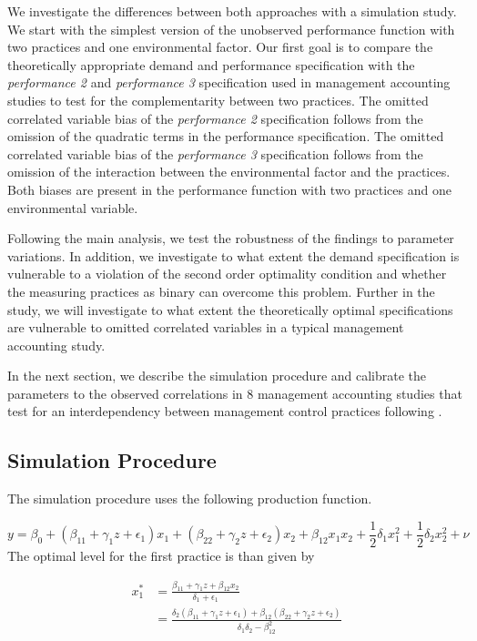 \documentclass[12pt]{article}
\begin{document}
We investigate the differences between both approaches with a simulation study. We start with the simplest version of the unobserved performance function with two practices and one environmental factor. Our first goal is to compare the theoretically appropriate demand and performance specification with the \emph{performance 2} and \emph{performance 3} specification used in management accounting studies to test for the complementarity between two practices. The omitted correlated variable bias of  the \emph{performance 2} specification follows from the omission of the quadratic terms in the performance specification. The omitted correlated variable bias of the \emph{performance 3} specification follows from the omission of the interaction between the environmental factor and the practices. Both biases are present in the performance function with two practices and one environmental variable. 

Following the main analysis, we test the robustness of the findings to parameter variations. In addition, we investigate to what extent the demand specification is vulnerable to a violation of the second order optimality condition and whether the measuring practices as binary can overcome this problem. Further in the study, we will investigate to what extent the theoretically optimal specifications are vulnerable to omitted correlated variables in a typical management accounting study. 

In the next section, we describe the simulation procedure and calibrate the parameters to the observed correlations in 8 management accounting studies that test for an interdependency between management control practices following \citet{Grabner2013}. 

\subsection{Simulation Procedure}

The simulation procedure uses the following production function. 

\begin{equation}\label{eq:structural}
y  = \beta_0 + (\beta_{11} + \gamma_1 z + \epsilon_1) x_1 
						+ (\beta_{22} + \gamma_2 z  + \epsilon_2) x_2 
                        + \beta_{12} x_1 x_2 + \frac{1}{2}\delta_1 x^2_1 + \frac{1}{2}\delta_2 x^2_2 + \nu
\end{equation}
The optimal level for the first practice is than given by 
	
\begin{equation}\label{eq:optimal}
\begin{aligned}
x_1^* &= \frac{\beta_11 + \gamma_1 z + \beta_{12} x_2}{\delta_1 + \epsilon_{1} } \\
		   &= \frac{\delta_2 (\beta_{11} + \gamma_1 z + \epsilon_1) 
           					+ \beta_{12} (\beta_{22} + \gamma_2 z + \epsilon_2) }
                            {\delta_1 \delta_2 - \beta_{12}^2}
\end{aligned}
\end{equation}
\end{document}
